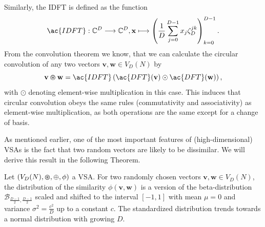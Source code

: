\begin{ex}
\begin{enumerate}
\begin{equation}
        \end{equation}
		Similarly, the \ac{IDFT} is defined as the function
        \begin{equation}
        \label{eq:inv_dft}
		\abb{\ac{IDFT}}{\mathbb{C}^{D}}{\mathbb{C}^{D}}{ \mathbf{x}}{\left( \frac{1}{D} \sum_{j=0}^{D-1} x_{j} \zeta_{D}^{jk} \right)_{k=0}^{D-1}}.
        \end{equation}
        From the convolution theorem \parencite[see][Chap. 6]{Bracewell2000} we know, that we can calculate the circular convolution of any two vectors $ \mathbf{v}, \mathbf{w} \in V_{D}(N)$ by
        \begin{equation}
        \label{eq:conv_with_dft}
		\mathbf{v} \varoast \mathbf{w} = \ac{IDFT}\left(\ac{DFT}( \mathbf{v}) \odot \ac{DFT}( \mathbf{w}) \right),
        \end{equation}
		with $\odot$ denoting element-wise multiplication in this case.
		This induces that circular convolution obeys the same rules (commutativity and associativity) as element-wise multiplication, as both operations are the same except for a change of basis.
	\end{enumerate}
\end{ex}
As mentioned earlier, one of the most important features of (high-dimensional) \acp{VSA} is the fact that two random vectors are likely to be dissimilar.
We will derive this result in the following Theorem.
\begin{theorem}
	\label{theorem:VSA_cossim_distribution}
	Let $\left(V_{D}(N), \varoast, \oplus, \phi \right)$ a \acl{VSA}.
    For two randomly chosen vectors $ \mathbf{v}, \mathbf{w} \in V_{D}(N)$, the distribution of the similarity $\phi\left( \mathbf{v}, \mathbf{w}\right)$ is a version of the beta-distribution $\mathcal{B}_{\frac{D-1}{2},\frac{D-1}{2}}$ scaled and shifted to the interval $\left[-1,1\right]$ with mean $\mu=0$ and variance $\sigma^2=\frac{c^2}{D}$ up to a constant $c$.
    The standardized distribution trends towards a normal distribution with growing $D$.
\end{theorem}
